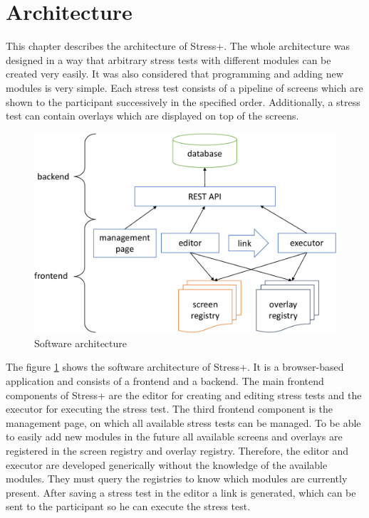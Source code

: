 \section{Architecture}
\label{sec:architecture}

This chapter describes the architecture of Stress+.
The whole architecture was designed in a way that arbitrary stress tests with different modules can be created very easily.
It was also considered that programming and adding new modules is very simple.
Each stress test consists of a pipeline of screens which are shown to the participant successively in the specified order.
Additionally, a stress test can contain overlays which are displayed on top of the screens.

\begin{figure}[htb]
  \centering
  \includegraphics[width=\textwidth]{figures/Architecture-crop}
  \caption{Software architecture}
  \label{fig:software-architecture}
\end{figure}

The figure \ref{fig:software-architecture} shows the software architecture of Stress+.
It is a browser-based \mbox{application} and consists of a frontend and a backend.
The main frontend components of Stress+ are the editor for creating and editing stress tests and the executor for executing the stress test.
The third frontend component is the management page, on which all available stress tests can be managed.
To be able to easily add new modules in the future all available screens and overlays are registered in the screen registry and overlay registry. 
Therefore, the editor and executor are developed generically without the knowledge of the available modules.
They must query the registries to know which modules are currently present.
After saving a stress test in the editor a link is generated, which can be sent to the participant so he can execute the stress test.

